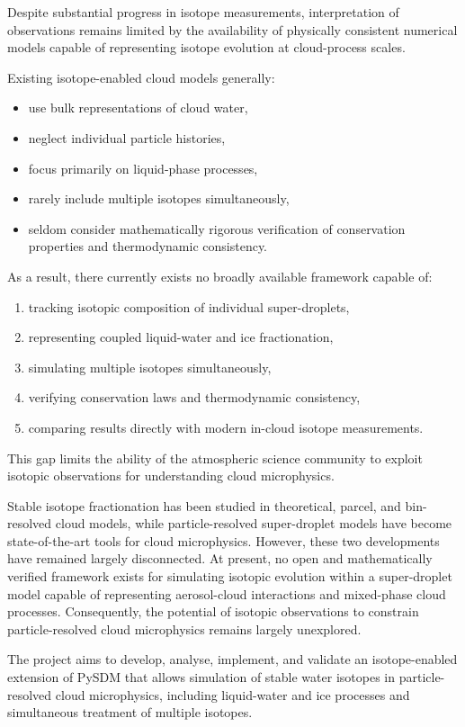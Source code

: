 \documentclass[11pt,a4paper]{article}
\begin{document}
Despite substantial progress in isotope measurements, interpretation of observations remains
limited by the availability of physically consistent numerical models capable
of representing isotope evolution at cloud-process scales.


Existing isotope-enabled cloud models generally:
\begin{itemize}
\item use bulk representations of cloud water,
\item neglect individual particle histories,
\item focus primarily on liquid-phase processes,
\item rarely include multiple isotopes simultaneously,
\item seldom consider mathematically rigorous verification of conservation properties and thermodynamic consistency.
\end{itemize}
As a result, there currently exists no broadly available framework capable of:
\begin{enumerate}
\item tracking isotopic composition of individual super-droplets,
\item representing coupled liquid-water and ice fractionation,
\item simulating multiple isotopes simultaneously,
\item verifying conservation laws and thermodynamic consistency,
\item comparing results directly with modern in-cloud isotope measurements.
\end{enumerate}
This gap limits the ability of the atmospheric science community to exploit isotopic observations
for understanding cloud microphysics.

Stable isotope fractionation has been studied in theoretical, parcel, and bin-resolved cloud models,
while particle-resolved super-droplet models have become state-of-the-art tools for cloud microphysics.
However, these two developments have remained largely disconnected.
At present, no open and mathematically verified framework exists for simulating isotopic evolution
within a super-droplet model capable of representing aerosol-cloud interactions and mixed-phase cloud processes.
Consequently, the potential of isotopic observations to
constrain particle-resolved cloud microphysics remains largely unexplored.

The project aims to develop, analyse, implement, and validate an isotope-enabled extension
of PySDM that allows simulation of stable water isotopes in particle-resolved cloud microphysics,
including liquid-water and ice processes and simultaneous treatment of multiple isotopes.
\end{document}
